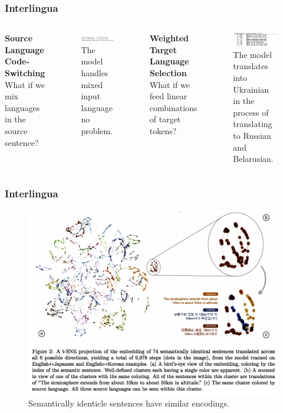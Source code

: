 \documentclass{beamer}
\begin{document}
\begin{frame}
\frametitle{Interlingua}
\begin{columns} %

\textbf{Source Language Code-Switching}
What if we mix languages in the source sentence?
 \begin{figure}
  \centering
  \includegraphics[width=\textwidth]{pres_imgs/srcswitch}
  \caption{\label{fig:srcswitch} The model handles mixed input language no problem.}
\end{figure}

\textbf{Weighted Target Language Selection}
What if we feed linear combinations of target tokens?
 \begin{figure}
  \centering
  \includegraphics[width=\textwidth]{pres_imgs/trgswitch}
  \caption{\label{fig:trgswitch} The model translates into Ukrainian in the process of translating to Russian and Belarusian.}
\end{figure}
\end{columns}
\end{frame}

\begin{frame}
\frametitle{Interlingua}
 \begin{figure}
  \centering
  \includegraphics[width=.75\textwidth]{pres_imgs/zeroshotlatent}
  \caption{\label{fig:zeroshotlatent} Semantically identicle sentences have similar encodings.}
\end{figure}
\end{frame}
\end{document}
